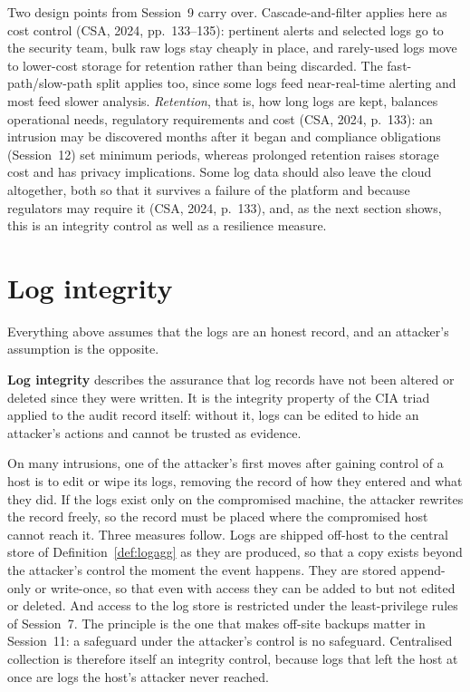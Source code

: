 Two design points from Session~9 carry over. Cascade-and-filter applies
here as cost control (CSA, 2024, pp.~133--135): pertinent alerts and
selected logs go to the security team, bulk raw logs stay cheaply in place,
and rarely-used logs move to lower-cost storage for retention rather than
being discarded. The fast-path/slow-path split applies too, since some logs
feed near-real-time alerting and most feed slower analysis.
\emph{Retention}, that is, how long logs are kept, balances operational
needs, regulatory requirements and cost (CSA, 2024, p.~133): an intrusion
may be discovered months after it began and compliance obligations
(Session~12) set minimum periods, whereas prolonged retention raises storage
cost and has privacy implications. Some log data should also leave the cloud
altogether, both so that it survives a failure of the platform and because
regulators may require it (CSA, 2024, p.~133), and, as the next section
shows, this is an integrity control as well as a resilience measure.

\section{Log integrity}

Everything above assumes that the logs are an honest record, and an
attacker's assumption is the opposite.

\begin{definition}\label{def:logintegrity}
\textbf{Log integrity} describes the assurance that log records have not been
altered or deleted since they were written. It is the integrity property of
the CIA triad applied to the audit record itself: without it, logs can be
edited to hide an attacker's actions and cannot be trusted as evidence.
\end{definition}

On many intrusions, one of the attacker's first moves after gaining control
of a host is to edit or wipe its logs, removing the record of how they
entered and what they did. If the logs exist only on the compromised
machine, the attacker rewrites the record freely, so the record must be
placed where the compromised host cannot reach it. Three measures follow.
Logs are shipped off-host to the central store of
Definition~\ref{def:logagg} as they are produced, so that a copy exists
beyond the attacker's control the moment the event happens. They are stored
append-only or write-once, so that even with access they can be added to
but not edited or deleted. And access to the log store is restricted under
the least-privilege rules of Session~7. The principle is the one that makes
off-site backups matter in Session~11: a safeguard under the attacker's
control is no safeguard. Centralised collection is therefore itself an
integrity control, because logs that left the host at once are logs the
host's attacker never reached.

